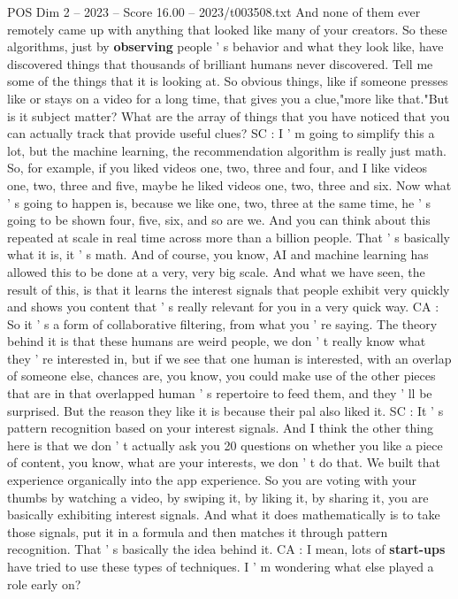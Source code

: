 \begin{textsample}{POS Dim 2 – 2023 – Score 16.00 – 2023/t003508.txt}
And none of them ever remotely came up with anything that looked like many of your creators.
So these algorithms, just by \textbf{observing} people ' s behavior and what they look like, have discovered things that thousands of brilliant humans never discovered.
Tell me some of the things that it is looking at.
So obvious things, like if someone presses like or stays on a video for a long time, that gives you a clue,"more like that."But is it subject matter?
What are the array of things that you have noticed that you can actually track that provide useful clues?
SC : I ' m going to simplify this a lot, but the machine learning, the recommendation algorithm is really just math.
So, for example, if you liked videos one, two, three and four, and I like videos one, two, three and five, maybe he liked videos one, two, three and six.
Now what ' s going to happen is, because we like one, two, three at the same time, he ' s going to be shown four, five, six, and so are we.
And you can think about this repeated at scale in real time across more than a billion people.
That ' s basically what it is, it ' s math.
And of course, you know, AI and machine learning has allowed this to be done at a very, very big scale.
And what we have seen, the result of this, is that it learns the interest signals that people exhibit very quickly and shows you content that ' s really relevant for you in a very quick way.
CA : So it ' s a form of collaborative filtering, from what you ' re saying.
The theory behind it is that these humans are weird people, we don ' t really know what they ' re interested in, but if we see that one human is interested, with an overlap of someone else, chances are, you know, you could make use of the other pieces that are in that overlapped human ' s repertoire to feed them, and they ' ll be surprised.
But the reason they like it is because their pal also liked it.
SC : It ' s pattern recognition based on your interest signals.
And I think the other thing here is that we don ' t actually ask you 20 questions on whether you like a piece of content, you know, what are your interests, we don ' t do that.
We built that experience organically into the app experience.
So you are voting with your thumbs by watching a video, by swiping it, by liking it, by sharing it, you are basically exhibiting interest signals.
And what it does mathematically is to take those signals, put it in a formula and then matches it through pattern recognition.
That ' s basically the idea behind it.
CA : I mean, lots of \textbf{start-ups} have tried to use these types of techniques.
I ' m wondering what else played a role early on?

\end{textsample}
